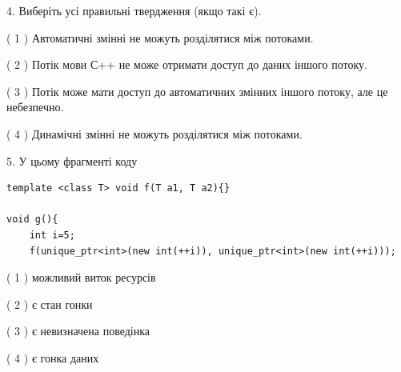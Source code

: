 \documentclass[12pt, ukrainian]{article}
\begin{document}
\begin {large}
{%
4. Виберіть усі правильні твердження (якщо такі є).\par
\vspace{2mm}

( 1 ) Автоматичні змінні не можуть розділятися між потоками.%

( 2 ) Потік мови С++ не може отримати доступ до даних іншого потоку.%

( 3 ) Потік може мати доступ до автоматичних змінних іншого потоку, але це небезпечно.%

( 4 ) Динамічні змінні не можуть розділятися між потоками.%


5. У цьому фрагменті коду
\begin{verbatim}
template <class T> void f(T a1, T a2){}

void g(){
    int i=5;
    f(unique_ptr<int>(new int(++i)), unique_ptr<int>(new int(++i)));
\end{verbatim}

( 1 ) можливий виток ресурсів%

( 2 ) є стан гонки%

( 3 ) є невизначена поведінка%

( 4 ) є гонка даних%
}
\end {large}
\end{document}
